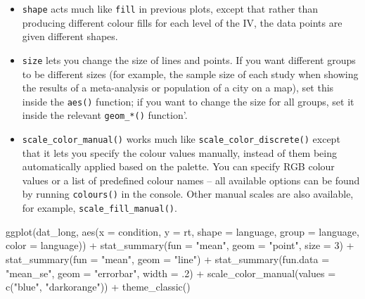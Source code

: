 \documentclass[
  english,
  doc,floatsintext]{apa6}
\newenvironment{Shaded}{\begin{snugshade}}{\end{snugshade}}
\newcommand{\AttributeTok}[1]{\textcolor[rgb]{0.77,0.63,0.00}{#1}}
\newcommand{\DecValTok}[1]{\textcolor[rgb]{0.00,0.00,0.81}{#1}}
\newcommand{\FunctionTok}[1]{\textcolor[rgb]{0.00,0.00,0.00}{#1}}
\newcommand{\NormalTok}[1]{#1}
\newcommand{\SpecialCharTok}[1]{\textcolor[rgb]{0.00,0.00,0.00}{#1}}
\newcommand{\StringTok}[1]{\textcolor[rgb]{0.31,0.60,0.02}{#1}}
\begin{document}
\begin{itemize}
\item
  \texttt{shape} acts much like \texttt{fill} in previous plots, except that rather than producing different colour fills for each level of the IV, the data points are given different shapes.
\item
  \texttt{size} lets you change the size of lines and points. If you want different groups to be different sizes (for example, the sample size of each study when showing the results of a meta-analysis or population of a city on a map), set this inside the \texttt{aes()} function; if you want to change the size for all groups, set it inside the relevant \texttt{geom\_*()} function'.
\item
  \texttt{scale\_color\_manual()} works much like \texttt{scale\_color\_discrete()} except that it lets you specify the colour values manually, instead of them being automatically applied based on the palette. You can specify RGB colour values or a list of predefined colour names -- all available options can be found by running \texttt{colours()} in the console. Other manual scales are also available, for example, \texttt{scale\_fill\_manual()}.
\end{itemize}

\begin{Shaded}
\begin{Highlighting}[]
\FunctionTok{ggplot}\NormalTok{(dat\_long, }\FunctionTok{aes}\NormalTok{(}\AttributeTok{x =}\NormalTok{ condition, }\AttributeTok{y =}\NormalTok{ rt, }
                     \AttributeTok{shape =}\NormalTok{ language,}
                     \AttributeTok{group =}\NormalTok{ language,}
                     \AttributeTok{color =}\NormalTok{ language)) }\SpecialCharTok{+}
  \FunctionTok{stat\_summary}\NormalTok{(}\AttributeTok{fun =} \StringTok{"mean"}\NormalTok{, }\AttributeTok{geom =} \StringTok{"point"}\NormalTok{, }\AttributeTok{size =} \DecValTok{3}\NormalTok{) }\SpecialCharTok{+}
  \FunctionTok{stat\_summary}\NormalTok{(}\AttributeTok{fun =} \StringTok{"mean"}\NormalTok{, }\AttributeTok{geom =} \StringTok{"line"}\NormalTok{) }\SpecialCharTok{+}
  \FunctionTok{stat\_summary}\NormalTok{(}\AttributeTok{fun.data =} \StringTok{"mean\_se"}\NormalTok{, }\AttributeTok{geom =} \StringTok{"errorbar"}\NormalTok{, }\AttributeTok{width =}\NormalTok{ .}\DecValTok{2}\NormalTok{) }\SpecialCharTok{+}
  \FunctionTok{scale\_color\_manual}\NormalTok{(}\AttributeTok{values =} \FunctionTok{c}\NormalTok{(}\StringTok{"blue"}\NormalTok{, }\StringTok{"darkorange"}\NormalTok{)) }\SpecialCharTok{+}
  \FunctionTok{theme\_classic}\NormalTok{()}
\end{Highlighting}
\end{Shaded}
\end{document}
